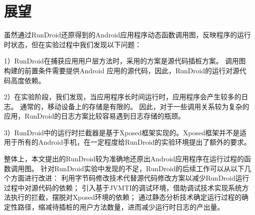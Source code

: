 
\section{展望}

虽然通过RunDroid还原得到的Android应用程序动态函数调用图，反映程序的运行时状态，但在实验过程中我们发现以下问题：

1）RunDroid在捕获应用用户层方法时，采用的方案是源代码插桩方案。
调用图构建的前置条件需要提供Android 应用的源代码，因此，RunDroid的运行对源代码高度依赖。

2）在实验阶段，我们发现，当应用程序长时间运行时，应用程序会产生较多的日志。
通常的，移动设备上的存储是有限的。
因此，对于一些调用关系较为复杂的应用，RunDroid的日志方案比较容易遇到日志存储的瓶颈。

3）RunDroid中的运行时拦截器是基于Xposed框架实现的。Xposed框架并不是适用于所有的Android手机，在一定程度给RunDroid的实验环境提出了额外的要求。

整体上，本文提出的RunDroid较为准确地还原出Android应用程序在运行过程的函数调用图。
针对RunDroid实验中发现的不足，RunDroid的后续工作可以从以下几个方面进行改进：
利用字节码修改技术代替源代码修改方案以减少RunDroid运行过程中对源代码的依赖；
引入基于JVMTI的调试环境，借助调试技术实现系统方法执行的拦截，摆脱对Xposed环境的依赖；
通过静态分析技术确定运行过程的确定性路径，缩减待插桩的用户方法数量，进而减少运行时日志的产出量。